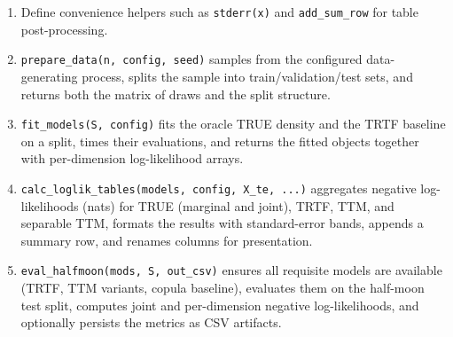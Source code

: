 \documentclass[11pt,a4paper,twoside]{book}\usepackage[]{graphicx}\usepackage[]{xcolor}
\begin{document}
\begin{enumerate}
  \item Define convenience helpers such as \texttt{stderr(x)} and \texttt{add\_sum\_row} for table post-processing.
  \item \texttt{prepare\_data(n, config, seed)} samples from the configured data-generating process, splits the sample into train/validation/test sets, and returns both the matrix of draws and the split structure.
  \item \texttt{fit\_models(S, config)} fits the oracle TRUE density and the TRTF baseline on a split, times their evaluations, and returns the fitted objects together with per-dimension log-likelihood arrays.
  \item \texttt{calc\_loglik\_tables(models, config, X\_te, ...)} aggregates negative log-likelihoods (nats) for TRUE (marginal and joint), TRTF, TTM, and separable TTM, formats the results with standard-error bands, appends a summary row, and renames columns for presentation.
  \item \texttt{eval\_halfmoon(mods, S, out\_csv)} ensures all requisite models are available (TRTF, TTM variants, copula baseline), evaluates them on the half-moon test split, computes joint and per-dimension negative log-likelihoods, and optionally persists the metrics as CSV artifacts.
\end{enumerate}
\end{document}
